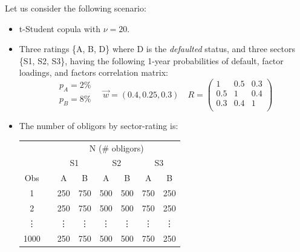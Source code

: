 \documentclass[11pt,fleqn]{book} %
\begin{document}
\begin{example}
	\label{ex:calib}
	Let us consider the following scenario:
	\begin{itemize}
		\item t-Student copula with $\nu=20$.
		\item Three ratings \{A, B, D\} where D is the \emph{defaulted} status, 
		and three sectors \{S1, S2, S3\}, having the following 1-year probabilities 
		of default, factor loadings, and factors correlation matrix:
		\begin{displaymath}
			\begin{array}{l}
				p_A=2\%     \\
				p_B=8\%     \\
			\end{array}
			\quad
			\vec{w} = (0.4, 0.25, 0.3)
			\quad 
			R = \left(
			\begin{array}{ccc}
				1 & 0.5 & 0.3 \\
				0.5 & 1 & 0.4 \\
				0.3 & 0.4 & 1 \\
			\end{array}
			\right) 
		\end{displaymath}
		\item The number of obligors by sector-rating is:\\
		\newline
		\hspace*{1cm}
		\small
		\begin{tabular}{cc|c|c||c|c||c|c|}
			\cline{3-8}
			& & \multicolumn{6}{|c|}{N (\# obligors)} \\
			\cline{3-8}
			& & \multicolumn{2}{|c||}{S1} & \multicolumn{2}{|c||}{S2} & \multicolumn{2}{|c|}{S3} \\
			\cline{1-1} \cline{3-8}
			\multicolumn{1}{|c|}{Obs} & & A & B & A & B & A & B \\
			\cline{1-1} \cline{3-8}
			\multicolumn{1}{|c|}{1} & & 250 & 750 & 500 & 500 & 750 & 250 \\
			\cline{1-1} \cline{3-8}
			\multicolumn{1}{|c|}{2} & & 250 & 750 & 500 & 500 & 750 & 250 \\
			\cline{1-1} \cline{3-8}
			\multicolumn{1}{|c|}{\vdots} & & \vdots & \vdots & \vdots & \vdots & \vdots & \vdots \\
			\cline{1-1} \cline{3-8}
			\multicolumn{1}{|c|}{1000} & & 250 & 750 & 500 & 500 & 750 & 250 \\
			\cline{1-1} \cline{3-8}
		\end{tabular}
	\end{itemize}
	\vspace{11pt}


\end{example}
\end{document}
